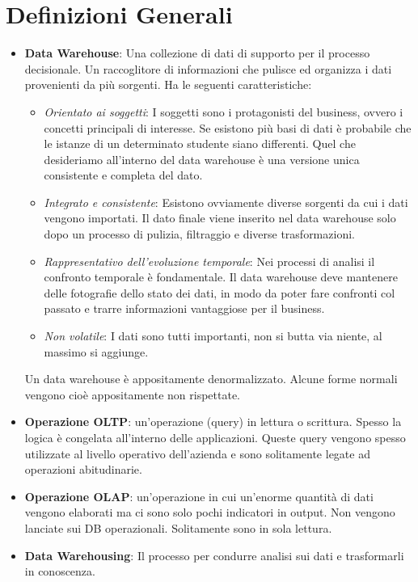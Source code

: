 \section{Definizioni Generali}

\begin{itemize}
	\item \textbf{Data Warehouse}: Una collezione di dati di supporto per il processo decisionale. Un raccoglitore di informazioni che pulisce ed organizza i dati provenienti da più sorgenti. Ha le seguenti caratteristiche:
	\begin{itemize}
		\item \textit{Orientato ai soggetti}: I soggetti sono i protagonisti del business, ovvero i concetti principali di interesse. Se esistono più basi di dati è probabile che le istanze di un determinato studente siano differenti. Quel che desideriamo all'interno del data warehouse è una versione unica consistente e completa del dato.
		\item \textit{Integrato e consistente}: Esistono ovviamente diverse sorgenti da cui i dati vengono importati. Il dato finale viene inserito nel data warehouse solo dopo un processo di pulizia, filtraggio e diverse trasformazioni.
		\item \textit{Rappresentativo dell'evoluzione temporale}: Nei processi di analisi il confronto temporale è fondamentale. Il data warehouse deve mantenere delle fotografie dello stato dei dati, in modo da poter fare confronti col passato e trarre informazioni vantaggiose per il business.
		\item \textit{Non volatile}: I dati sono tutti importanti, non si butta via niente, al massimo si aggiunge.
	\end{itemize}
	Un data warehouse è appositamente denormalizzato. Alcune forme normali vengono cioè appositamente non rispettate.
	\item \textbf{Operazione OLTP}: un'operazione (query) in lettura o scrittura. Spesso la logica è congelata all'interno delle applicazioni. Queste query vengono spesso utilizzate al livello operativo dell'azienda e sono solitamente legate ad operazioni abitudinarie.
	\item \textbf{Operazione OLAP}: un'operazione in cui un'enorme quantità di dati vengono elaborati ma ci sono solo pochi indicatori in output. Non vengono lanciate sui DB operazionali. Solitamente sono in sola lettura.
	\item \textbf{Data Warehousing}: Il processo per condurre analisi sui dati e trasformarli in conoscenza.

\end{itemize}

